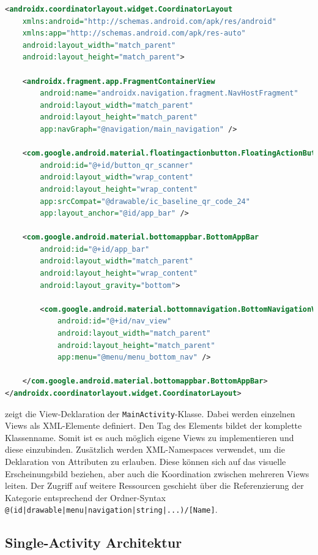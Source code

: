 \begin{lstlisting}[language=XML, caption={Layout-Definition der \texttt{MainActivity}-Klasse}, label={lst:layout}]
<androidx.coordinatorlayout.widget.CoordinatorLayout  
    xmlns:android="http://schemas.android.com/apk/res/android"
    xmlns:app="http://schemas.android.com/apk/res-auto"
    android:layout_width="match_parent"
    android:layout_height="match_parent">

    <androidx.fragment.app.FragmentContainerView
        android:name="androidx.navigation.fragment.NavHostFragment"
        android:layout_width="match_parent"
        android:layout_height="match_parent"
        app:navGraph="@navigation/main_navigation" />

    <com.google.android.material.floatingactionbutton.FloatingActionButton
        android:id="@+id/button_qr_scanner"
        android:layout_width="wrap_content"
        android:layout_height="wrap_content"
        app:srcCompat="@drawable/ic_baseline_qr_code_24"
        app:layout_anchor="@id/app_bar" />
  
    <com.google.android.material.bottomappbar.BottomAppBar
        android:id="@+id/app_bar"
        android:layout_width="match_parent"
        android:layout_height="wrap_content"
        android:layout_gravity="bottom">

        <com.google.android.material.bottomnavigation.BottomNavigationView
            android:id="@+id/nav_view"
            android:layout_width="match_parent"
            android:layout_height="match_parent"
            app:menu="@menu/menu_bottom_nav" />
    
    </com.google.android.material.bottomappbar.BottomAppBar>
</androidx.coordinatorlayout.widget.CoordinatorLayout>  
\end{lstlisting}

 zeigt die View-Deklaration der \texttt{MainActivity}-Klasse. Dabei werden einzelnen Views als XML-Elemente definiert. Den Tag des Elements bildet der komplette Klassenname. Somit ist es auch möglich eigene Views zu implementieren und diese einzubinden. Zusätzlich werden XML-Namespaces verwendet, um die Deklaration von Attributen zu erlauben. Diese können sich auf das visuelle Erscheinungsbild beziehen, aber auch die Koordination zwischen mehreren Views leiten. Der Zugriff auf weitere Ressourcen geschieht über die Referenzierung der Kategorie entsprechend der Ordner-Syntax \texttt{@(id|drawable|menu|navigation|string|...)/[Name]}. 

\subsection{Single-Activity Architektur}

